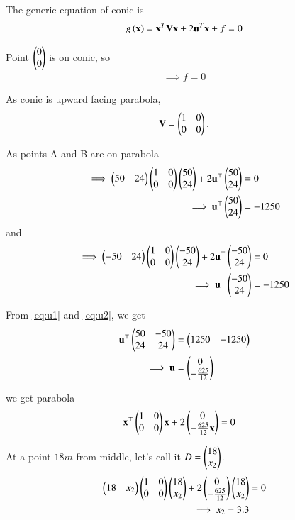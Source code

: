 \documentclass[journal,12pt,twocolumn]{IEEEtran}
\renewcommand{\vec}[1]{\boldsymbol{\mathbf{#1}}}
\begin{document}
The generic equation of conic is
\begin{align}
    \label{eq:1} g\brak{\vec{x}} = \vec{x}^T\vec{V}\vec{x} + 2\vec{u}^T\vec{x} + f = 0 
\end{align}

Point $\begin{pmatrix}0\\0\end{pmatrix}$ is on conic, so
\begin{align}
    \implies f = 0
\end{align}

As conic is upward facing parabola,
\begin{align}
    \vec{V} = \myvec{1&0\\0&0}.
\end{align}

As points A and B are on parabola
\begin{align}
    \implies \myvec{50&24}\myvec{1&0\\0&0}\myvec{50\\24} + 2\vec{u}^\top\myvec{50\\24} &= 0\\
    \label{eq:u1} \implies \vec{u}^{\top}\myvec{50\\24} &= -1250
\end{align}
and
\begin{align}
    \implies \myvec{-50&24}\myvec{1&0\\0&0}\myvec{-50\\24} + 2\vec{u}^\top\myvec{-50\\24} &= 0\\
    \label{eq:u2} \implies \vec{u}^{\top}\myvec{-50\\24} &= -1250
\end{align}

From \eqref{eq:u1} and \eqref{eq:u2}, we get
\begin{align}
    \vec{u}^\top\myvec{50&-50\\24&24} &= \myvec{1250&-1250}\\
    \implies \vec{u} &= \myvec{0\\-\frac{625}{12}}
\end{align} 

we get parabola
\begin{align}
    \label{eq:parab1} \vec{x}^\top\myvec{1&0\\0&0}\vec{x} + 2\myvec{0\\-\frac{625}{12}\vec{x}} &= 0 
\end{align}

At a point $18 m$ from middle, let's call it $D = \begin{pmatrix}18\\x_2\end{pmatrix}$.
\begin{align}
    \begin{pmatrix}18&x_2\end{pmatrix}\begin{pmatrix}1&0\\0&0\end{pmatrix}\begin{pmatrix}18\\x_2\end{pmatrix} + 2\begin{pmatrix}0\\-\frac{625}{12}\end{pmatrix}\begin{pmatrix}18\\x_2\end{pmatrix} &= 0\\
    \implies x_2 = 3.3 
\end{align}
\end{document}
